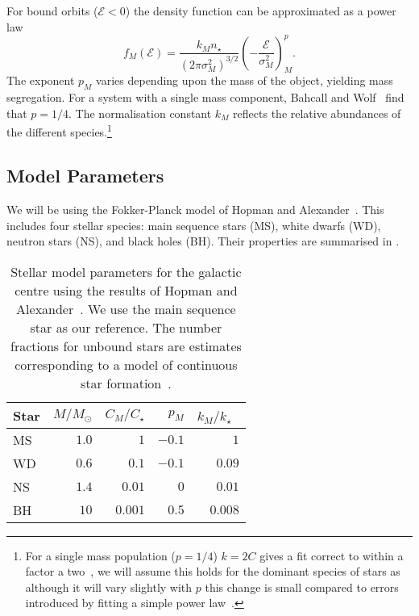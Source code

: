 \documentclass[useAMS,usenatbib]{mn2e}
\begin{document}
For bound orbits ($\mathcal{E} < 0$) the density function can be approximated as a power law
\begin{equation}
f_M(\mathcal{E}) = \frac{k_M n_\star}{(2\pi\sigma_M^2)^{3/2}}\left(-\frac{\mathcal{E}}{\sigma_M^2}\right)^p_M.
\end{equation}
The exponent $p_M$ varies depending upon the mass of the object, yielding mass segregation. For a system with a single mass component, Bahcall and Wolf~\cite{Bahcall1976} find that $p = 1/4$. The normalisation constant $k_M$ reflects the relative abundances of the different species.\footnote{For a single mass population ($p = 1/4$) $k = 2 C$ gives a fit correct to within a factor a two~\cite{Bahcall1976,Kesher2009}, we will assume this holds for the dominant species of stars as although it will vary slightly with $p$ this change is small compared to errors introduced by fitting a simple power law~\cite{Hopman2006, Alexander2009}.}

\subsection{Model Parameters}

We will be using the Fokker-Planck model of Hopman and Alexander~\cite{Hopman2006, Hopman2006a, Hopman2009}. This includes four stellar species: main sequence stars (MS), white dwarfs (WD), neutron stars (NS), and black holes (BH). Their properties are summarised in .
\begin{table*}
 \centering
 \begin{minipage}{140mm}
  \caption{Stellar model parameters for the galactic centre using the results of Hopman and Alexander~\cite{Hopman2009}. We use the main sequence star as our reference. The number fractions for unbound stars are estimates corresponding to a model of continuous star formation~\cite{Alexander2005}.\label{tab:HA}}
  \begin{tabular}{@{}lrrrr@{}}
  \hline
   Star & $M/M_\odot$ & $C_M/C_\star$ & $p_M$ & $k_M/k_\star$~\cite{Toonen2009} \\
 \hline
 MS & $1.0$ & $1$ & $-0.1$ & $1$ \\
 WD & $0.6$ & $0.1$ & $-0.1$ & $0.09$ \\
 NS & $1.4$ & $0.01$ & $0$ & $0.01$  \\
 BH & $10$ & $0.001$ & $0.5$ & $0.008$ \\
\hline
\end{tabular}
\end{minipage}
\end{table*}
\end{document}
